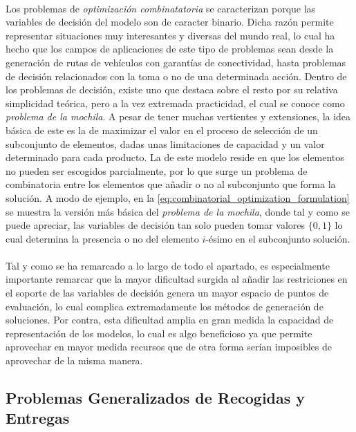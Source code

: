 \documentclass{subfiles}
\begin{document}
        \paragraph{}
        Los problemas de \emph{optimización combinatatoria} se caracterizan porque las variables de decisión del modelo son de caracter binario. Dicha razón permite representar situaciones muy interesantes y diversas del mundo real, lo cual ha hecho que los campos de aplicaciones de este tipo de problemas sean desde la generación de rutas de vehículos con garantías de conectividad, hasta problemas de decisión relacionados con la toma o no de una determinada acción. Dentro de los problemas de decisión, existe uno que destaca sobre el resto por su relativa simplicidad teórica, pero a la vez extremada practicidad, el cual se conoce como \emph{problema de la mochila}. A pesar de tener muchas vertientes y extensiones, la idea básica de este es la de maximizar el valor en el proceso de selección de un subconjunto de elementos, dadas unas limitaciones de capacidad y un valor determinado para cada producto. La  de este modelo reside en que los elementos no pueden ser escogidos parcialmente, por lo que surge un problema de combinatoria entre los elementos que añadir o no al subconjunto que forma la solución. A modo de ejemplo, en la \cref{eq:combinatorial_optimization_formulation} se muestra la versión más básica del \emph{problema de la mochila}, donde tal y como se puede apreciar, las variables de decisión tan solo pueden tomar valores $\{0, 1\}$ lo cual determina la presencia o no del elemento $i$-ésimo en el subconjunto solución.

        \paragraph{}
        Tal y como se ha remarcado a lo largo de todo el apartado, es especialmente importante remarcar que la mayor dificultad surgida al añadir las restriciones en el soporte de las variables de decisión genera un mayor espacio de puntos de evaluación, lo cual complica extremadamente los métodos de generación de soluciones. Por contra, esta dificultad amplia en gran medida la capacidad de representación de los modelos, lo cual es algo beneficioso ya que permite aprovechar en mayor medida recursos que de otra forma serían imposibles de aprovechar de la misma manera.

      \subsection{Problemas Generalizados de Recogidas y Entregas}
      \label{sec:formulation_generalized_pickup_and_delivery_problems}
\end{document}
